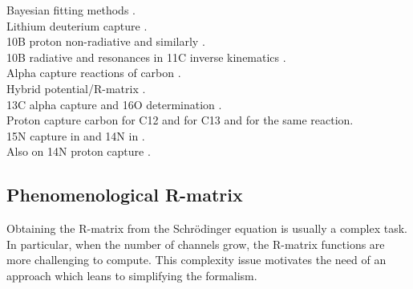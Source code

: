 \documentclass[openany]{book}
\begin{document}
Bayesian fitting methods \cite{odell_brune_phillips_2022}. \\

Lithium deuterium capture \cite{grineviciute_lamia_mukhamedzhanov_spitaleri_lacognata_2015}. \\

10B proton non-radiative \cite{kolk_macon_deboer_anderson_boeltzig_brandenburg_brune_chen_clark_danley_et_2022} and similarly \cite{sieverding_randhawa_zetterberg_deboer_ahn_mancino_martinez-pinedo_hix_2022}. \\

10B radiative and resonances in 11C inverse kinematics \cite{kaur_guimaraes_zamora_assuncao_alcantara-nunez_delara_zevallos_ribeiro_lichtenthaler_pires_et_2022}. \\

Alpha capture reactions of carbon \cite{schurmann_gialanella_kunz_strieder_2012}.  \\

 Hybrid potential/R-matrix \cite{sparenberg_2005}. \\

 13C alpha capture and 16O determination \cite{prusachenko_bobrovsky_bondarenko_bokhovko_gurbich_ketlerov_2022}. \\

Proton capture carbon \cite{burtebaev_igamov_peterson_yarmukhamedov_zazulin_2008} for C12 and \cite{chakraborty_deboer_mukherjee_roy_2015} for C13 and \cite{genard_descouvemont_terwagne_2010} for the same reaction. \\

15N capture in \cite{barker_2008} and 14N in \cite{angulo_champagne_trautvetter_2005}.  \\

Also on 14N proton capture \cite{formicola_imbriani_costantini_angulo_bemmerer_bonetti_broggini_corvisiero_cruz_descouvemont_et_2004}. \\

\subsection{Phenomenological R-matrix} \label{sub:rmatrix_phenomenological}

Obtaining the R-matrix from the Schrödinger equation is usually a complex task. In particular, when the number of channels grow, the R-matrix functions are more challenging to compute. This complexity issue motivates the need of an approach which leans to simplifying the formalism.  \\
\end{document}
